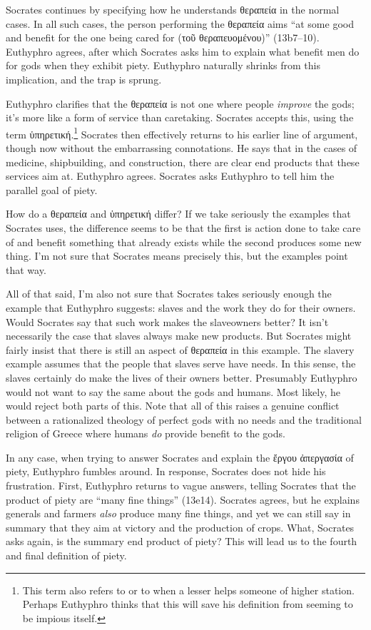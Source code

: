 \documentclass[11pt]{article}
\begin{document}
Socrates continues by specifying how he understands {\g θεραπεία} in the normal cases.  In all such cases, the person performing the {\g θεραπεία} aims ``at some good and benefit for the one being cared for ({\g τοῦ θεραπευομένου})'' (13b7--10).  Euthyphro agrees, after which Socrates asks him to explain what benefit men do for gods when they exhibit piety.  Euthyphro naturally shrinks from this implication, and the trap is sprung.

Euthyphro clarifies that the {\g θεραπεία} is not one where people \emph{improve} the gods; it's more like a form of service than caretaking.  Socrates accepts this, using the term {\g ὑπηρετική}.\footnote{This term also refers to  or to when a lesser helps someone of higher station.  Perhaps Euthyphro thinks that this will save his definition from seeming to be impious itself.}  Socrates then effectively returns to his earlier line of argument, though now without the embarrassing connotations.  He says that in the cases of medicine, shipbuilding, and construction, there are clear end products that these services aim at. Euthyphro agrees.  Socrates asks Euthyphro to tell him the parallel goal of piety.

How do a {\g θεραπεία} and {\g ὑπηρετική} differ?  If we take seriously the examples that Socrates uses, the difference seems to be that the first is action done to take care of and benefit something that already exists while the second produces some new thing.  I'm not sure that Socrates means precisely this, but the examples point that way.

All of that said, I'm also not sure that Socrates takes seriously enough the example that Euthyphro suggests: slaves and the work they do for their owners.  Would Socrates say that such work makes the slaveowners better?  It isn't necessarily the case that slaves always make new products.  But Socrates might fairly insist that there is still an aspect of {\g θεραπεία} in this example.  The slavery example assumes that the people that slaves serve have needs.  In this sense, the slaves certainly do make the lives of their owners better.  Presumably Euthyphro would not want to say the same about the gods and humans.  Most likely, he would reject both parts of this.  Note that all of this raises a genuine conflict between a rationalized theology of perfect gods with no needs and the traditional religion of Greece where humans \textit{do} provide benefit to the gods.

In any case, when trying to answer Socrates and explain the {\g ἔργου ἀπεργασία} of piety, Euthyphro fumbles around. In response, Socrates does not hide his frustration.  First, Euthyphro returns to vague answers, telling Socrates that the product of piety are ``many fine things'' (13e14).  Socrates agrees, but he explains generals and farmers \emph{also} produce many fine things, and yet we can still say in summary that they aim at victory and the production of crops.  What, Socrates asks again, is the summary end product of piety?  This will lead us to the fourth and final definition of piety.
\end{document}
